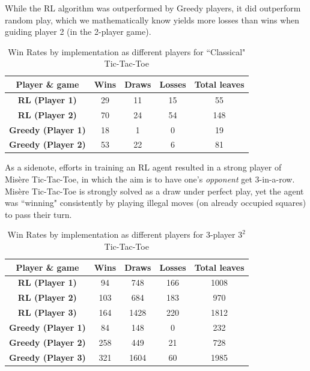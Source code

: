 \documentclass[12pt,a4paper]{article}
\begin{document}
While the RL algorithm was outperformed by Greedy players, it did outperform random play, which we mathematically know yields more losses than wins when guiding player 2 (in the 2-player game). 
\begin{table}[htb]
\centering
\caption{Win Rates by implementation as different players for ``Classical" Tic-Tac-Toe}
\vspace*{6pt}
\label{classic_result}
\begin{tabular}{|c|c|c|c|c|} \hline
{\bf Player \& game} & {\bf Wins} & {\bf Draws} & {\bf Losses} & {\bf Total leaves} \\ \hline
{\bf RL (Player 1)} & 29 & 11 & 15 & 55 \\ \hline
{\bf RL (Player 2)} & 70 & 24 & 54 & 148 \\ \hline
{\bf Greedy (Player 1)} & 18 & 1 & 0 & 19 \\ \hline
{\bf Greedy (Player 2)} & 53 & 22 & 6 & 81 \\ \hline
\end{tabular}
\end{table}

As a sidenote, efforts in training an RL agent resulted in a strong player of Misère Tic-Tac-Toe, in which the aim is to have one's \textit{opponent} get 3-in-a-row. Misère Tic-Tac-Toe is strongly solved as a draw under perfect play, yet the agent was ``winning" consistently by playing illegal moves (on already occupied squares) to pass their turn. 

\begin{table}[htb]
\centering
\caption{Win Rates by implementation as different players for 3-player $3^2$ Tic-Tac-Toe}
\vspace*{6pt}
\label{classic3_result}
\begin{tabular}{|c|c|c|c|c|} \hline
{\bf Player \& game} & {\bf Wins} & {\bf Draws} & {\bf Losses} & {\bf Total leaves} \\ \hline
{\bf RL (Player 1)} & 94 & 748 & 166 & 1008 \\ \hline
{\bf RL (Player 2)} & 103 & 684 & 183 & 970\\ \hline
{\bf RL (Player 3)} & 164 & 1428 & 220 & 1812 \\ \hline
{\bf Greedy (Player 1)} & 84 & 148 & 0 & 232 \\ \hline
{\bf Greedy (Player 2)} & 258 & 449 & 21 & 728 \\ \hline
{\bf Greedy (Player 3)} & 321 & 1604 & 60 & 1985 \\ \hline
\end{tabular}
\end{table}
\end{document}
